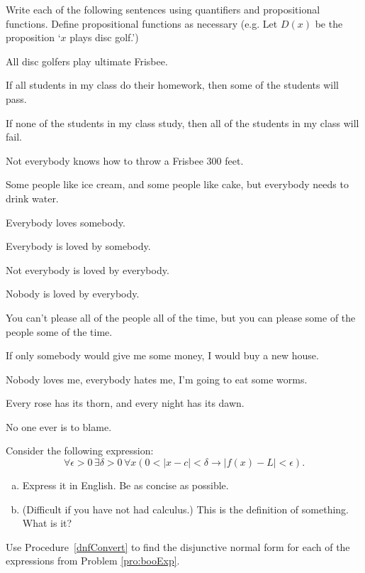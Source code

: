 \begin{pro}
Write each of the following sentences using quantifiers and 
propositional functions.  Define propositional functions as necessary 
(e.g. Let $D(x)$ be the proposition `$x$ plays disc golf.')
\begin{lenum}
\item
All disc golfers play ultimate Frisbee.
\item
If all students in my class do their homework, then some of the
students will pass.
\item
If none of the students in my class study, then all of the students in
my class will fail.
\item
Not everybody knows how to throw a Frisbee 300 feet.
\item
Some people like ice cream, and some people like cake, but everybody
needs to drink water.
\item
Everybody loves somebody.
\item
Everybody is loved by somebody.
\item
Not everybody is loved by everybody.
\item
Nobody is loved by everybody.
\item
You can't please all of the people all of the time, but you can please
some of the people some of the time.
\item
If only somebody would give me some money, I would buy a new house.
\item
Nobody loves me, everybody hates me, I'm going to eat some worms.
\item
Every rose has its thorn, and every night has its dawn.
\item
No one ever is to blame.
\end{lenum}
\end{pro}

\begin{pro}
Consider the following expression: 
$$\forall\epsilon{>}0\, \exists \delta{>}0\, \forall x(0<|x-c|<\delta \rightarrow |f(x)-L|<\epsilon).$$
\begin{enumerate}[(a)]
\item
Express it in English.  Be as concise as possible.
\item
(Difficult if you have not had calculus.) This is the definition of something.  What is it?
\end{enumerate}
\end{pro}


\begin{pro}
Use Procedure~\ref{dnfConvert} to find the disjunctive normal form for each of the expressions from 
Problem \ref{pro:booExp}.
\end{pro}


